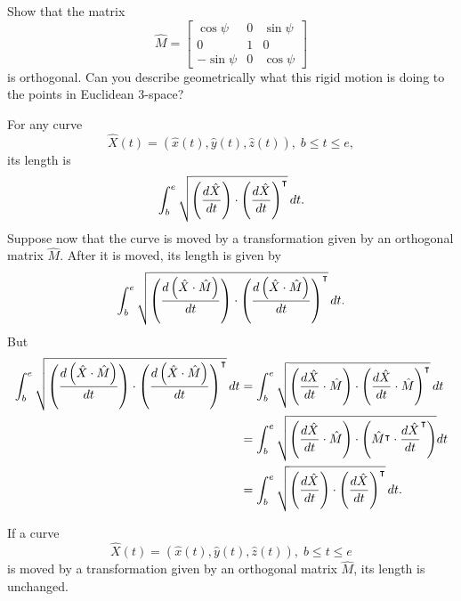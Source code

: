 \documentclass{ximera}
\begin{document}
\begin{problem}
Show that the matrix%
\[
\hat{M}=\begin{bmatrix}
%
\cos\psi & 0 & \sin\psi\\
0 & 1 & 0\\
-\sin\psi & 0 & \cos\psi
\end{bmatrix}
\]
is orthogonal. Can you describe geometrically what this rigid motion is doing
to the points in Euclidean $3$-space?
\end{problem}

For any curve%
\[
\hat{X}\left(  t\right)  =\left(  \hat{x}\left(  t\right)  ,\hat{y}\left(
t\right)  ,\hat{z}\left(  t\right)  \right)  ,\;b\leq t\leq e,
\]
its length is%
\[%
\int\nolimits_{b}^{e}
\sqrt{\left(  \frac{d\hat{X}}{dt}\right)  \cdot\left(  \frac{d\hat{X}}%
{dt}\right)  ^\transpose}\,dt.
\]
Suppose now that the curve is moved by a transformation given by an orthogonal
matrix $\hat{M}$. After it is moved, its length is given by%
\[%
\int\nolimits_{b}^{e}
\sqrt{\left(  \frac{d\left(  \hat{X}\cdot\hat{M}\right)  }{dt}\right)
\cdot\left(  \frac{d\left(  \hat{X}\cdot\hat{M}\right)  }{dt}\right)  ^\transpose%
}\,dt.
\]
But%
\begin{align*}%
\int_{b}^{e}
\sqrt{\left(  \frac{d\left(  \hat{X}\cdot\hat{M}\right)  }{dt}\right)
\cdot\left(  \frac{d\left(  \hat{X}\cdot\hat{M}\right)  }{dt}\right)  ^\transpose}\,dt
&  =%
\int_{b}^{e}
\sqrt{\left(  \frac{d\hat{X}}{dt}\cdot\hat{M}\right)  \cdot\left(  \frac
{d\hat{X}}{dt}\cdot\hat{M}\right)  ^\transpose}\,dt\\
&  =%
\int_{b}^{e}
\sqrt{\left(  \frac{d\hat{X}}{dt}\cdot\hat{M}\right)  \cdot\left(  \hat{M}%
^\transpose\cdot\frac{d\hat{X}}{dt}^\transpose\right)  }dt\\
&  =%
\int\nolimits_{b}^{e}
\sqrt{\left(  \frac{d\hat{X}}{dt}\right)  \cdot\left(  \frac{d\hat{X}}%
{dt}\right)  ^\transpose}\,dt.
\end{align*}


\begin{corollary}
If a curve
\[
\hat{X}\left(  t\right)  =\left(  \hat{x}\left(  t\right)  ,\hat{y}\left(
t\right)  ,\hat{z}\left(  t\right)  \right)  ,\;b\leq t\leq e
\]
is moved by a transformation given by an orthogonal matrix $\hat{M}$, its
length is unchanged.\pagebreak
\end{corollary}
\end{document}
